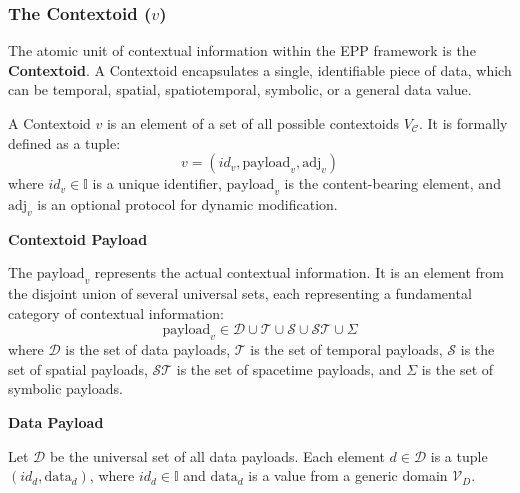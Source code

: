 \subsubsection[The Contextoid (v)]{The Contextoid (\(v\))}
\label{ssec:contextoid_formal_revised}

The atomic unit of contextual information within the EPP framework is the \textbf{Contextoid}. A Contextoid encapsulates a single, identifiable piece of data, which can be temporal, spatial, spatiotemporal, symbolic, or a general data value.

\begin{definition}[Contextoid]
\label{def:contextoid}
A Contextoid \( v \) is an element of a set of all possible contextoids \( V_{\mathcal{C}} \). It is formally defined as a tuple:
\[ v = (id_v, \text{payload}_v, \text{adj}_v) \]
where \( id_v \in \mathbb{I} \) is a unique identifier, \( \text{payload}_v \) is the content-bearing element, and \( \text{adj}_v \) is an optional protocol for dynamic modification.
\end{definition}


\textbf{Contextoid Payload}\newline 

\begin{definition}
\label{def:contextoid_paylod}
The \( \text{payload}_v \) represents the actual contextual information. It is an element from the disjoint union of several universal sets, each representing a fundamental category of contextual information:
\[ \text{payload}_v \in \mathcal{D} \cup \mathcal{T} \cup \mathcal{S} \cup \mathcal{ST} \cup \Sigma \]
where \(\mathcal{D}\) is the set of data payloads, \(\mathcal{T}\) is the set of temporal payloads, \(\mathcal{S}\) is the set of spatial payloads, \(\mathcal{ST}\) is the set of spacetime payloads, and \(\Sigma\) is the set of symbolic payloads.
\end{definition}

\newpage

\textbf{Data Payload}\newline 

\begin{definition}
\label{def:contextoid_paylod_data}
Let \(\mathcal{D}\) be the universal set of all data payloads. Each element \(d \in \mathcal{D}\) is a tuple \( (id_d, \text{data}_d) \), where \(id_d \in \mathbb{I}\) and \(\text{data}_d\) is a value from a generic domain \(\mathcal{V}_D\).
\end{definition}

